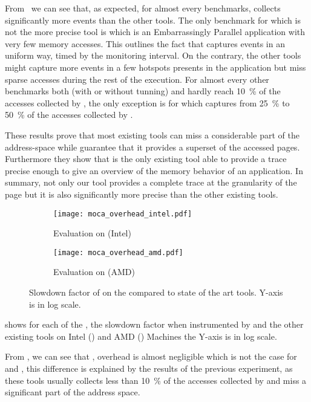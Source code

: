 From  we can see that, as expected, for almost every benchmarks,
\Moca collects significantly more events than the other tools.  The only
benchmark for which \Moca is not the more precise tool is \EP which is an
Embarrassingly Parallel application with very few memory accesses.
This outlines the fact that \Moca captures events in an uniform way, timed by the monitoring interval.
On the contrary, the other tools might capture more events in a few hotspots presents in the application but miss
sparse accesses during the rest of the execution.
For almost
every other benchmarks both \Mitos (with or without tunning) and \MemProf
hardly reach \SI{10}{\%} of the accesses collected by \Moca, the only exception is
\CG for which \MemProf captures from \SI{25}{\%} to \SI{50}{\%} of the accesses
collected by \Moca.

These results prove that most existing tools can miss a considerable part of
the address-space while \Moca guarantee that it provides a superset of the accessed
pages. Furthermore they show that \Moca is the only existing tool able to provide a
trace precise enough to give an overview of the memory behavior of an application. In
summary, not only our tool provides a complete trace at the granularity of the
page but it is also significantly more precise than the other existing tools.

\begin{figure}[htb]
    \centering
    \begin{subfigure}{\linewidth}
        \texttt{[image: moca\_overhead\_intel.pdf]}
        \caption{Evaluation on \Edel (Intel)}
        \label{fig:ovh-Intel}
    \end{subfigure}
    \begin{subfigure}{\linewidth}
        \texttt{[image: moca\_overhead\_amd.pdf]}
        \caption{Evaluation on \Idfreeze (AMD)}
        \label{fig:ovh-AMD}
    \end{subfigure}
    \caption{Slowdown factor of \Moca on the \NPB compared to state of the art tools.
    Y-axis is in log scale.}
    \label{fig:ovh}
\end{figure}

 shows for each of the \NPB, the slowdown factor when
instrumented by \Moca and the other existing tools on Intel
() and AMD () Machines the Y-axis is in
log scale.

From , we can see that \Mitos, \MitosTun overhead is
almost negligible which is not the case for \Moca and \TABARNAC, this
difference is explained by the results of the previous experiment, as these
tools usually collects less than \SI{10}{\%} of the accesses collected by \Moca and
miss a significant part of the address space.

